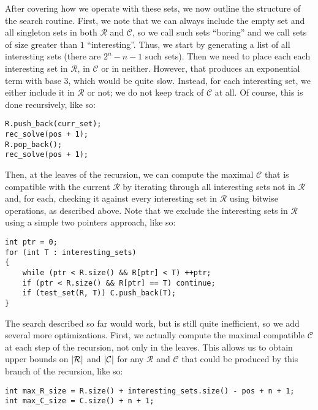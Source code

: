 \documentclass{report}
\DeclarePairedDelimiter{\abs}{\lvert}{\rvert}
\theoremstyle{definition}
\begin{document}
After covering how we operate with these sets, we now outline the structure of the
search routine. First, we note that we can always include the empty set and all
singleton sets in both $\mathcal{R}$ and $\mathcal{C}$, so we call such sets
``boring'' and we call sets of size greater than $1$ ``interesting''. Thus, we start
by generating a list of all interesting sets (there are $2^n - n - 1$ such sets).
Then we need to place each each interesting set in $\mathcal{R}$, in $\mathcal{C}$
or in neither. However, that produces an exponential term with base $3$, which would
be quite slow. Instead, for each interesting set, we either include it in
$\mathcal{R}$ or not; we do not keep track of $\mathcal{C}$ at all. Of course,
this is done recursively, like so:

\begin{lstlisting}
R.push_back(curr_set);
rec_solve(pos + 1);
R.pop_back();
rec_solve(pos + 1);
\end{lstlisting}

Then, at the leaves of the recursion, we can compute the maximal $\mathcal{C}$ that
is compatible with the current $\mathcal{R}$ by iterating through all interesting
sets not in $\mathcal{R}$ and, for each, checking it against every interesting set
in $\mathcal{R}$ using bitwise operations, as described above. Note that we
exclude the interesting sets in $\mathcal{R}$ using a simple two pointers approach,
like so:

\begin{lstlisting}
int ptr = 0;
for (int T : interesting_sets)
{
    while (ptr < R.size() && R[ptr] < T) ++ptr;
    if (ptr < R.size() && R[ptr] == T) continue;
    if (test_set(R, T)) C.push_back(T);
}
\end{lstlisting}

The search described so far would work, but is still quite inefficient, so we add
several more optimizations. First, we actually compute the maximal compatible
$\mathcal{C}$ at each step of the recursion, not only in the leaves. This allows
us to obtain upper bounds on $\abs{\mathcal{R}}$ and $\abs{\mathcal{C}}$ for
any $\mathcal{R}$ and $\mathcal{C}$ that could be produced by this branch of the
recursion, like so:

\begin{lstlisting}
int max_R_size = R.size() + interesting_sets.size() - pos + n + 1;
int max_C_size = C.size() + n + 1;
\end{lstlisting}
\end{document}

